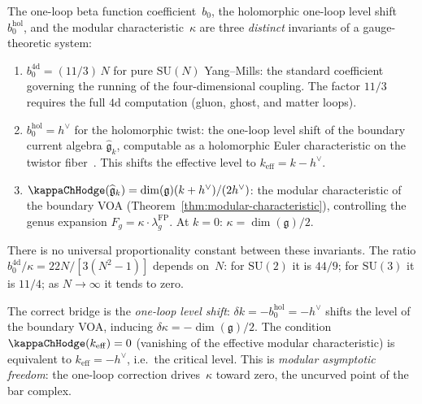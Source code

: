 \begin{remark}
\label{rem:beta-function-kappa-distinction}
The one-loop beta function coefficient~$b_0$, the holomorphic
one-loop level shift~$b_0^{\mathrm{hol}}$, and the modular
characteristic~$\kappa$ are three \emph{distinct} invariants
of a gauge-theoretic system:
\begin{enumerate}[label=\textup{(\roman*)}]
\item $b_0^{4\mathrm{d}} = (11/3)\,N$ for pure $\mathrm{SU}(N)$
 Yang--Mills: the standard coefficient governing the
 running of the four-dimensional coupling. The factor $11/3$
 requires the full $4\mathrm{d}$ computation (gluon, ghost,
 and matter loops).

\item $b_0^{\mathrm{hol}} = h^\vee$ for the holomorphic twist:
 the one-loop level shift of the boundary current algebra
 $\widehat{\mathfrak{g}}_{k}$, computable as a holomorphic
 Euler characteristic on the twistor
 fiber~\cite{Costello2111}. This shifts the effective level to
 $k_{\mathrm{eff}} = k - h^\vee$.

\item $\kappaChHodge(\widehat{\mathfrak{g}}_k)
 = \dim(\mathfrak{g})(k + h^\vee)/(2h^\vee)$: the modular
 characteristic of the boundary VOA
 \textup{(}Theorem~\textup{\ref{thm:modular-characteristic}}\textup{)},
 controlling the genus expansion
 $F_g = \kappa \cdot \lambda_g^{\mathrm{FP}}$. At $k = 0$: $\kappa = \dim(\mathfrak{g})/2$.
\end{enumerate}
There is no universal proportionality constant between these
invariants. The ratio $b_0^{4\mathrm{d}}/\kappa
= 22N/[3(N^2-1)]$
depends on~$N$: for $\mathrm{SU}(2)$ it is $44/9$; for
$\mathrm{SU}(3)$ it is $11/4$; as $N \to \infty$ it tends
to zero.

The correct bridge is the \emph{one-loop level shift}:
$\delta k = -b_0^{\mathrm{hol}} = -h^\vee$ shifts the level of
the boundary VOA, inducing
$\delta\kappa = -\dim(\mathfrak{g})/2$. The condition
$\kappaChHodge(k_{\mathrm{eff}}) = 0$ (vanishing of the effective
modular characteristic) is equivalent to
$k_{\mathrm{eff}} = -h^\vee$, i.e.\ the critical level. This
is \emph{modular asymptotic freedom}: the one-loop correction
drives~$\kappa$ toward zero, the uncurved point of the bar
complex.
\end{remark}

